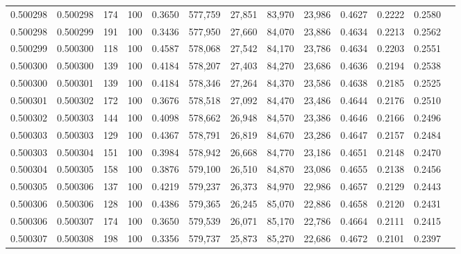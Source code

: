 \begin{tabular}{rrrrrrrrrrrrr}
0.500298 & 0.500298 &   174 & 100 &                                     0.3650 & 577,759 &  27,851 &  83,970 &  23,986 & 0.4627 & 0.2222 & 0.2580 \\
0.500298 & 0.500299 &   191 & 100 &                                     0.3436 & 577,950 &  27,660 &  84,070 &  23,886 & 0.4634 & 0.2213 & 0.2562 \\
0.500299 & 0.500300 &   118 & 100 &                                     0.4587 & 578,068 &  27,542 &  84,170 &  23,786 & 0.4634 & 0.2203 & 0.2551 \\
0.500300 & 0.500300 &   139 & 100 &                                     0.4184 & 578,207 &  27,403 &  84,270 &  23,686 & 0.4636 & 0.2194 & 0.2538 \\
0.500300 & 0.500301 &   139 & 100 &                                     0.4184 & 578,346 &  27,264 &  84,370 &  23,586 & 0.4638 & 0.2185 & 0.2525 \\
0.500301 & 0.500302 &   172 & 100 &                                     0.3676 & 578,518 &  27,092 &  84,470 &  23,486 & 0.4644 & 0.2176 & 0.2510 \\
0.500302 & 0.500303 &   144 & 100 &                                     0.4098 & 578,662 &  26,948 &  84,570 &  23,386 & 0.4646 & 0.2166 & 0.2496 \\
0.500303 & 0.500303 &   129 & 100 &                                     0.4367 & 578,791 &  26,819 &  84,670 &  23,286 & 0.4647 & 0.2157 & 0.2484 \\
0.500303 & 0.500304 &   151 & 100 &                                     0.3984 & 578,942 &  26,668 &  84,770 &  23,186 & 0.4651 & 0.2148 & 0.2470 \\
0.500304 & 0.500305 &   158 & 100 &                                     0.3876 & 579,100 &  26,510 &  84,870 &  23,086 & 0.4655 & 0.2138 & 0.2456 \\
0.500305 & 0.500306 &   137 & 100 &                                     0.4219 & 579,237 &  26,373 &  84,970 &  22,986 & 0.4657 & 0.2129 & 0.2443 \\
0.500306 & 0.500306 &   128 & 100 &                                     0.4386 & 579,365 &  26,245 &  85,070 &  22,886 & 0.4658 & 0.2120 & 0.2431 \\
0.500306 & 0.500307 &   174 & 100 &                                     0.3650 & 579,539 &  26,071 &  85,170 &  22,786 & 0.4664 & 0.2111 & 0.2415 \\
0.500307 & 0.500308 &   198 & 100 &                                     0.3356 & 579,737 &  25,873 &  85,270 &  22,686 & 0.4672 & 0.2101 & 0.2397 \\

\end{tabular}

